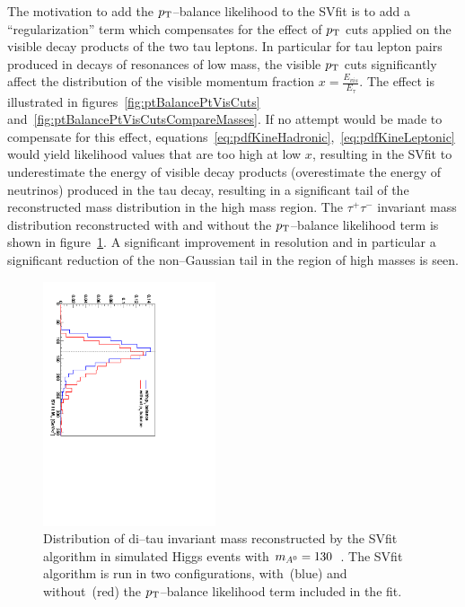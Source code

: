 The motivation to add the $p_{\mathrm{T}}$--balance likelihood to the SVfit is to add a
``regularization'' term which compensates for the effect of $p_{\mathrm{T}}$ cuts applied
on the visible decay products of the two tau leptons.  In particular for tau
lepton pairs produced in decays of resonances of low mass, the visible $p_{\mathrm{T}}$
cuts significantly affect the distribution of the visible momentum fraction $x =
\frac{E_{vis}}{E_{\tau}}$.  The effect is illustrated in
figures~\ref{fig:ptBalancePtVisCuts}
and~\ref{fig:ptBalancePtVisCutsCompareMasses}.  If no attempt would be made to
compensate for this effect,
equations~\ref{eq:pdfKineHadronic},~\ref{eq:pdfKineLeptonic} would yield
likelihood values that are too high at low $x$, resulting in the SVfit to
underestimate the energy of visible decay products (overestimate the energy of
neutrinos) produced in the tau decay, resulting in a significant tail of the
reconstructed mass distribution in the high mass region.  The $\tau^{+}
\tau^{-}$ invariant mass distribution reconstructed with and without the
$p_{\mathrm{T}}$--balance likelihood term is shown in
figure~\ref{fig:ptBalanceImprovedMassResolution}.  A significant improvement in
resolution and in particular a significant reduction of the non--Gaussian tail
in the region of high masses is seen.

\begin{figure}[t]
\begin{center}
\includegraphics*[height=72mm,
angle=90]{svfit_chapter/figures/pt_balance_effect.pdf} \caption[Effect of
\pt--balance term on SVfit performance]{\captiontext Distribution of di--tau
invariant mass reconstructed by the SVfit algorithm in simulated Higgs events
with $m_{A^0} = 130$~\GeVcc.  The SVfit algorithm is run in two
configurations, with~(blue) and without~(red) the $p_{\mathrm{T}}$--balance likelihood term
included in the fit. 
} \label{fig:ptBalanceImprovedMassResolution}
\end{center}
\end{figure} 

